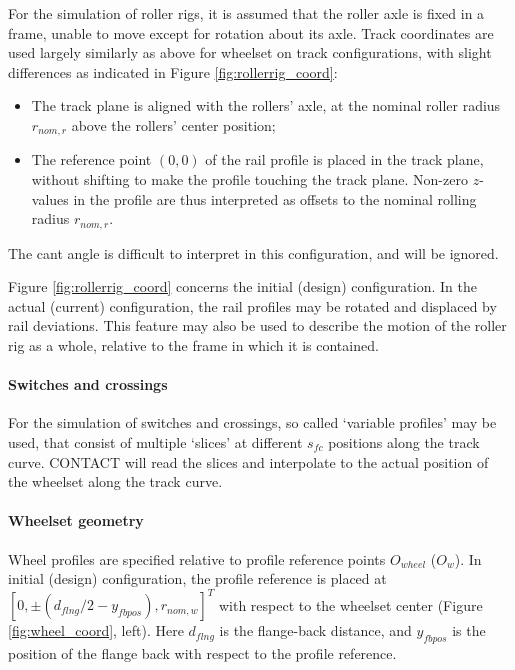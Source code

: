 \documentclass[12pt]{report}
\begin{document}
For the simulation of roller rigs, it is assumed that the roller axle is
fixed in a frame, unable to move except for rotation about its axle. Track
coordinates are used largely similarly as above for wheelset on track
configurations, with slight differences as indicated in Figure
\ref{fig:rollerrig_coord}:
\begin{itemize}
\item The track plane is aligned with the rollers' axle, at the nominal
        roller radius $r_{nom,r}$ above the rollers' center position;
\item The reference point $(0,0)$ of the rail profile is placed in the
        track plane, without shifting to make the profile touching the
        track plane. Non-zero $z$-values in the profile are thus
        interpreted as offsets to the nominal rolling radius $r_{nom,r}$.
\end{itemize}
The cant angle is difficult to interpret in this configuration, and will be
ignored.

Figure \ref{fig:rollerrig_coord} concerns the initial (design)
configuration. In the actual (current) configuration, the rail profiles
may be rotated and displaced by rail deviations. This feature may also be
used to describe the motion of the roller rig as a whole, relative to the
frame in which it is contained.

\paragraph{Switches and crossings}

For the simulation of switches and crossings, so called `variable profiles'
may be used, that consist of multiple `slices' at different $s_{fc}$
positions along the track curve. CONTACT will read the slices and
interpolate to the actual position of the wheelset along the track curve.

\paragraph{Wheelset geometry}

Wheel profiles are specified relative to profile reference points
$O_{wheel}$ ($O_w$). In initial (design) configuration, the profile
reference is placed at $[0, \pm (d_{flng}/2-y_{fbpos}), r_{nom,w}]^T$ with
respect to the wheelset center (Figure \ref{fig:wheel_coord}, left). Here
$d_{flng}$ is the flange-back distance, and $y_{fbpos}$ is the position of
the flange back with respect to the profile reference. 
\end{document}
